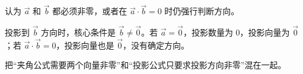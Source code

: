 \begin{trapbox}
	\medskip
	\begin{description}[style=nextline, leftmargin=2.8em, labelsep=0.5em, itemsep=0.35em]
		\item[\textbf{\textcolor{CTrap}{易错点四（零向量忽略）：}}] 认为 $\vec{a}$ 和 $\vec{b}$ 都必须非零，或者在 $\vec{a}\cdot\vec{b}=0$ 时仍强行判断方向。
		\item[\textbf{\textcolor{CTrap}{正确理解（条件边界）：}}] 投影到 $\vec{b}$ 方向时，核心条件是 $\vec{b}\ne\vec{0}$。若 $\vec{a}=\vec{0}$，投影数量为 $0$，投影向量为 $\vec{0}$；若 $\vec{a}\cdot\vec{b}=0$，投影向量也是 $\vec{0}$，没有确定方向。
		\item[\textbf{\textcolor{CTrap}{错因分析（条件照搬）：}}] 把“夹角公式需要两个向量非零”和“投影公式只要求投影方向非零”混在一起。
	\end{description}
\end{trapbox}